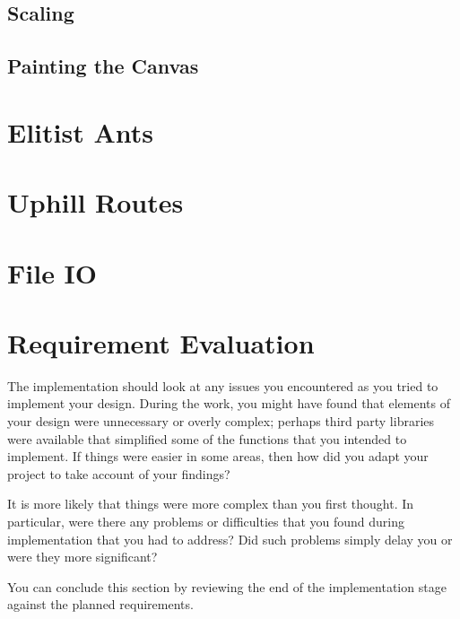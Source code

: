 \subsection{Scaling}

\subsection{Painting the Canvas}

\section{Elitist Ants}

\section{Uphill Routes}

\section{File IO}

\section{Requirement Evaluation}

The implementation should look at any issues you encountered as you tried to implement your design. During the work, you might have found that elements of your design were unnecessary or overly complex; perhaps third party libraries were available that simplified some of the functions that you intended to implement. If things were easier in some areas, then how did you adapt your project to take account of your findings?

It is more likely that things were more complex than you first thought. In particular, were there any problems or difficulties that you found during implementation that you had to address? Did such problems simply delay you or were they more significant? 

You can conclude this section by reviewing the end of the implementation stage against the planned requirements. 


